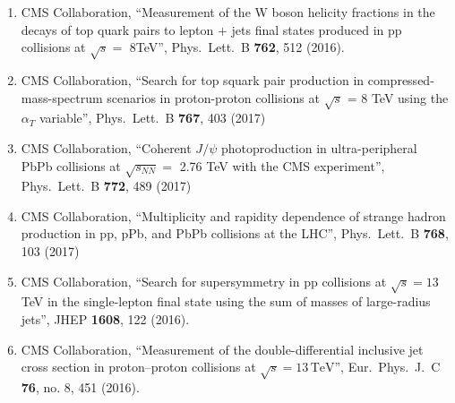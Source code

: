 \begin{itemize}
\begin{enumerate}
\item CMS Collaboration, ``Measurement of the W boson helicity fractions in the decays of top quark pairs to lepton $+$ jets final states produced in pp collisions at $\sqrt s=$ 8TeV'', Phys.\ Lett.\ B {\bf 762}, 512 (2016).

\item CMS Collaboration, ``Search for top squark pair production in compressed-mass-spectrum scenarios in proton-proton collisions at $\sqrt{s}$ = 8 TeV using the $\alpha_T$ variable'', Phys.\ Lett.\ B {\bf 767}, 403 (2017)

\item CMS Collaboration, ``Coherent $J/\psi$ photoproduction in ultra-peripheral PbPb collisions at $\sqrt {s_{NN}} =$ 2.76 TeV with the CMS experiment'', Phys.\ Lett.\ B {\bf 772}, 489 (2017)

\item CMS Collaboration, ``Multiplicity and rapidity dependence of strange hadron production in pp, pPb, and PbPb collisions at the LHC'', Phys.\ Lett.\ B {\bf 768}, 103 (2017)

\item CMS Collaboration, ``Search for supersymmetry in pp collisions at $ \sqrt{s}=13 $ TeV in the single-lepton final state using the sum of masses of large-radius jets'', JHEP {\bf 1608}, 122 (2016).

\item CMS Collaboration, ``Measurement of the double-differential inclusive jet cross section in proton–proton collisions at $\sqrt{s} = 13\,\text {TeV} $'', Eur.\ Phys.\ J.\ C {\bf 76}, no. 8, 451 (2016).


\end{enumerate}
\end{itemize}
